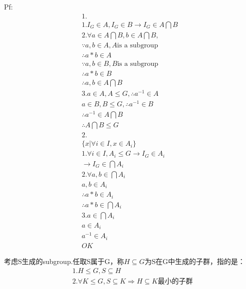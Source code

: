 \documentclass[12pt, a4paper]{article}  %
\begin{document}
Pf:
\begin{align}
    &1.\\
    &1.I_G\in A,I_G\in B\rightarrow I_G\in A\bigcap B\\
    &2. \forall a\in A\bigcap B,b\in A\bigcap B,\\
    &\because a,b\in A,A \text{is a subgroup}\\
    &\therefore a*b\in A\\
    &\because a,b\in B,B \text{is a subgroup}\\
    &\therefore a*b\in B\\
    &\therefore a,b\in A\bigcap B\\
    &3. a \in A,A\leqslant G,\therefore a^{-1} \in A\\
    &a \in B,B\leqslant G,\therefore a^{-1} \in B\\
    &\therefore a^{-1}\in A\bigcap B\\
    &\therefore A\bigcap B \leqslant G
    &  \\
    &2.\\
    &\{x|\forall i\in I,x\in A_i\}\\
    &1.\forall i\in I,A_i \leqslant G\rightarrow I_G\in A_i\\
    &\rightarrow I_G\in \bigcap A_i\\
    &2. \forall a,b \in \bigcap A_i\\
    & a,b\in A_i\\
    &\therefore a*b\in A_i\\
    &\therefore a*b\in \bigcap A_i\\
    &3. a\in \bigcap A_i\\
    & a\in A_i\\
    &a^{-1}\in A_i\\
    & OK
\end{align}

考虑S生成的subgroup.任取S属于G，称\(H \subseteq G\)为S在G中生成的子群，指的是：\\
\begin{align}
    &1.H\leqslant G,S\subseteq H\\
    &2.\forall K \leqslant G, S \subseteq K\Rightarrow H\subseteq K\text{最小的子群}
\end{align}
\end{document}
